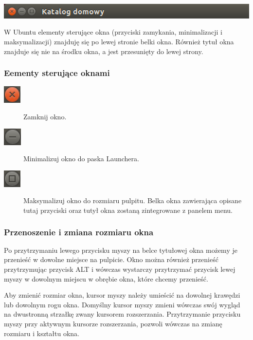 \begin{center}
	\includegraphics[scale=0.5]{images/unity_okno_belka.png}
\end{center}
W Ubuntu elementy sterujące okna (przyciski zamykania, minimalizacji i maksymalizacji) znajduję się po lewej stronie belki okna. Również tytuł okna znajduje się nie na środku okna, a jest przesunięty do lewej strony.

\subsubsection{Eementy sterujące oknami}
\begin{description}
\item[\includegraphics{images/unity_okno_exit.png}] Zamknij okno.
\item[\includegraphics{images/unity_okno_min.png}] Minimalizuj okno do paska Launchera.
\item[\includegraphics{images/unity_okno_max.png}] Maksymalizuj okno do rozmiaru pulpitu. Belka okna zawierająca opisane tutaj przyciski oraz tutył okna zostaną zintegrowane z panelem menu.
\end{description}

\subsubsection{Przenoszenie i zmiana rozmiaru okna}
Po przytrzymaniu lewego przycisku myszy na belce tytułowej okna możemy je przenieść w dowolne miejsce na pulpicie. Okno można również przenieść przytrzymując przycisk ALT i wówczas wystarczy przytrzymać przycisk lewej myszy w dowolnym miejscu w obrębie
okna, które chcemy przenieść. 

Aby zmienić rozmiar okna, kursor myszy należy umieścić na dowolnej krawędzi lub dowolnym rogu okna. Domyślny kursor myszy zmieni wówczas swój wygląd na dwustronną strzałkę zwany kursorem rozszerzania. Przytrzymanie przycisku myszy przy aktywnym kursorze rozszerzania, pozwoli wówczas na zmianę rozmiaru i kształtu okna.

